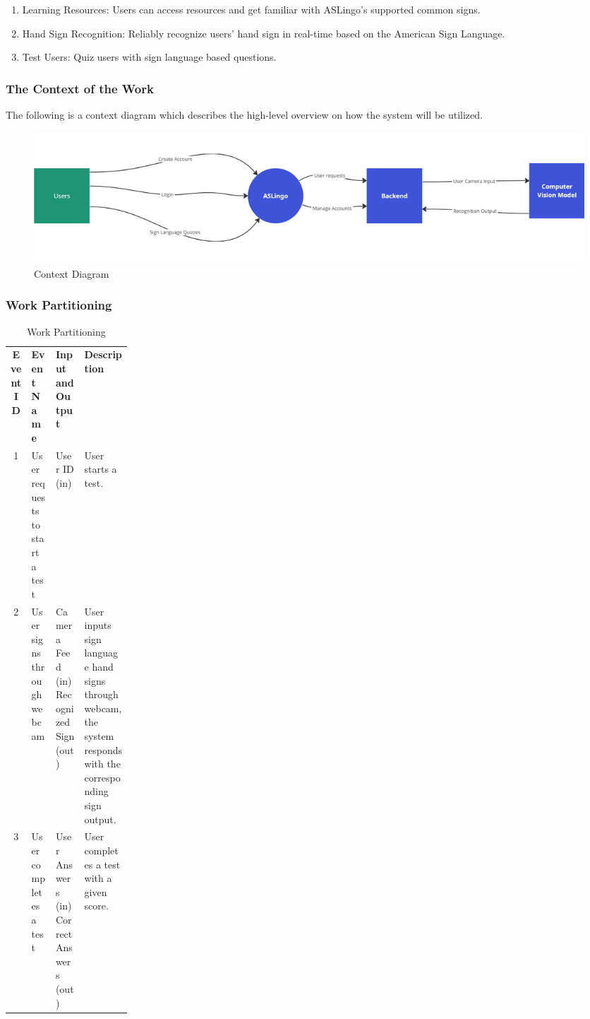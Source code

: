 \documentclass[12pt, titlepage]{article}
\begin{document}
\begin{enumerate}
  \item Learning Resources: Users can access resources and get familiar with ASLingo's supported common signs.
  \item Hand Sign Recognition: Reliably recognize users' hand sign in real-time based on the American Sign Language.
  \item Test Users: Quiz users with sign language based questions.
\end{enumerate}

\subsubsection{The Context of the Work}
The following is a context diagram which describes the high-level overview on how the system will be utilized.

\begin{figure}[H]
    \centering
    \includegraphics[scale=0.25]{context-diagram}
    \caption{Context Diagram}
\end{figure}

\subsubsection{Work Partitioning}

\begin{table}[H]
    \caption{Work Partitioning}
    \noindent \begin{tabularx}{\textwidth}{|c|p{0.2\linewidth}|X|X|}
    \hline 
    \textbf{Event ID} & \textbf{Event Name} &\textbf{Input and Output} & \textbf{Description}\\
    1 & User requests to start a test & User ID (in) & User starts a test. \\
    \hline
    2 & User signs through webcam & Camera Feed (in) \newline Recognized Sign (out) & User inputs sign language hand signs through webcam, the system responds with the corresponding sign output. \\
    \hline
    3 & User completes a test & User Answers (in) \newline Correct Answers (out) & User completes a test with a given score. \\
    \hline
    \end{tabularx}
    \end{table}
  
\end{document}

